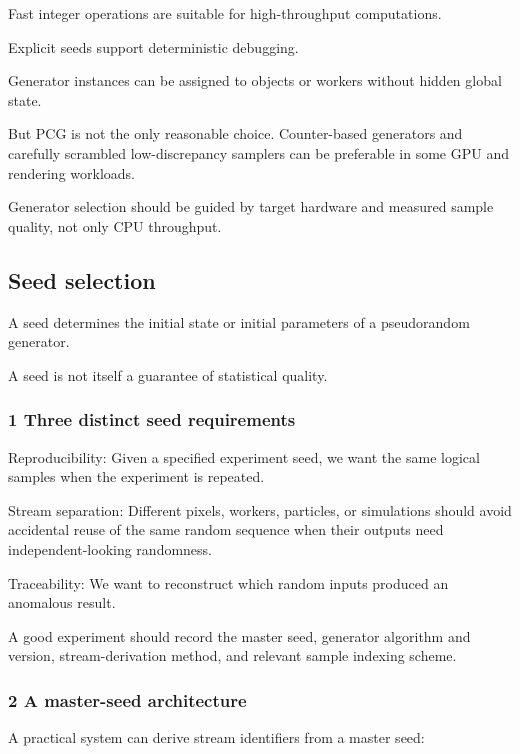 Fast integer operations are suitable for high-throughput computations.

Explicit seeds support deterministic debugging.

Generator instances can be assigned to objects or workers without hidden global state.

But PCG is not the only reasonable choice. Counter-based generators and carefully scrambled low-discrepancy samplers can be preferable in some GPU and rendering workloads.

Generator selection should be guided by target hardware and measured sample quality, not only CPU throughput.

\subsection{Seed selection}\label{02-foundations-ii-ch029-seed-selection}

A seed determines the initial state or initial parameters of a pseudorandom generator.

A seed is not itself a guarantee of statistical quality.

\subsubsection{1 Three distinct seed requirements}\label{02-foundations-ii-ch029-three-distinct-seed-requirements}

Reproducibility: Given a specified experiment seed, we want the same logical samples when the experiment is repeated.

Stream separation: Different pixels, workers, particles, or simulations should avoid accidental reuse of the same random sequence when their outputs need independent-looking randomness.

Traceability: We want to reconstruct which random inputs produced an anomalous result.

A good experiment should record the master seed, generator algorithm and version, stream-derivation method, and relevant sample indexing scheme.

\subsubsection{2 A master-seed architecture}\label{02-foundations-ii-ch029-a-master-seed-architecture}

A practical system can derive stream identifiers from a master seed:

